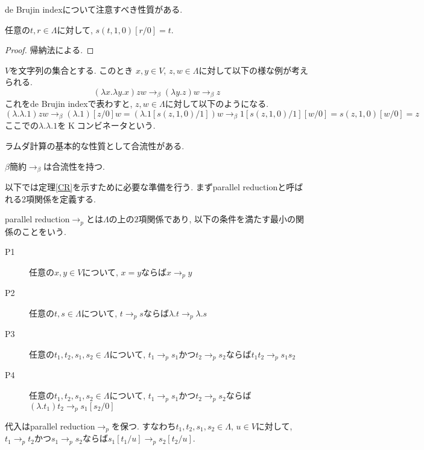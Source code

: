 \documentclass[12pt, titlepage]{ltjsarticle}
\DeclareMathOperator{\K}{K}
\begin{document}
de Brujin indexについて注意すべき性質がある.

\begin{lem}
 任意の$t, r \in \Lambda$に対して, $s (t, 1, 0)[r/0] = t$.
\end{lem}
\begin{proof}
 帰納法による.
\end{proof}

\begin{ex}[$\K$ コンビネータ]
 $V$を文字列の集合とする. このとき $x, y \in V$, $z, w \in \Lambda$に対して以下の様な例が考えられる.
 \[
 (\lambda x. \lambda y. x) z w \rightarrow_{\beta} (\lambda y. z) w \rightarrow_{\beta} z
 \]
 これをde Brujin indexで表わすと, $z, w \in \Lambda$に対して以下のようになる.
 \[
 (\lambda. \lambda. 1) z w \rightarrow_{\beta} (\lambda. 1)[z/0] w = (\lambda. 1[s (z, 1, 0)/1]) w \rightarrow_{\beta} 1[s (z, 1, 0)/1][w/0] = s (z, 1, 0)[w/0] = z
 \]
ここでの$\lambda. \lambda. 1$を$\K$コンビネータという.
\end{ex}

ラムダ計算の基本的な性質として合流性がある.

\begin{thm}\label{CR}
 $\beta$簡約$\rightarrow_{\beta}$は合流性を持つ.
\end{thm}

以下では定理\ref{CR}を示すために必要な準備を行う. まずparallel reductionと呼ばれる2項関係を定義する.

\begin{defn}
 parallel reduction$\rightarrow_{p}$とは$\Lambda$の上の$2$項関係であり, 以下の条件を満たす最小の関係のことをいう.
 \begin{description}
  \item[P1] 任意の$x, y \in V$について, $x = y$ならば$x \rightarrow_{p} y$
  \item[P2] 任意の$t, s \in \Lambda$について, $t \rightarrow_{p} s$ならば$\lambda. t \rightarrow_{p} \lambda. s$
  \item[P3] 任意の$t_1, t_2, s_1, s_2 \in \Lambda$について,
        $t_1 \rightarrow_{p} s_1$かつ$t_2 \rightarrow_{p} s_2$ならば$t_1 t_2 \rightarrow_{p} s_1 s_2$
  \item[P4] 任意の$t_1, t_2, s_1, s_2 \in \Lambda$について,
        $t_1 \rightarrow_{p} s_1$かつ$t_2 \rightarrow_{p} s_2$ならば$(\lambda. t_1) t_2 \rightarrow_{p} s_1[s_2/0]$
 \end{description}
\end{defn}

\begin{lem}\label{spp}
 代入はparallel reduction$\rightarrow_{p}$を保つ. すなわち$t_1, t_2, s_1, s_2 \in \Lambda$, $u \in V$に対して, $t_1 \rightarrow_{p} t_2$かつ$s_1 \rightarrow_{p} s_2$ならば$s_1[t_1/u] \rightarrow_{p} s_2[t_2/u]$.
\end{lem}
\end{document}
